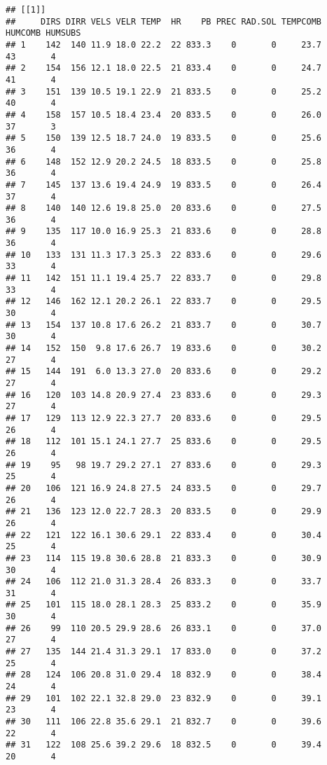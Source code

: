 \documentclass[
]{article}
\begin{document}
\begin{verbatim}
## [[1]]
##     DIRS DIRR VELS VELR TEMP  HR    PB PREC RAD.SOL TEMPCOMB HUMCOMB HUMSUBS
## 1    142  140 11.9 18.0 22.2  22 833.3    0       0     23.7      43       4
## 2    154  156 12.1 18.0 22.5  21 833.4    0       0     24.7      41       4
## 3    151  139 10.5 19.1 22.9  21 833.5    0       0     25.2      40       4
## 4    158  157 10.5 18.4 23.4  20 833.5    0       0     26.0      37       3
## 5    150  139 12.5 18.7 24.0  19 833.5    0       0     25.6      36       4
## 6    148  152 12.9 20.2 24.5  18 833.5    0       0     25.8      36       4
## 7    145  137 13.6 19.4 24.9  19 833.5    0       0     26.4      37       4
## 8    140  140 12.6 19.8 25.0  20 833.6    0       0     27.5      36       4
## 9    135  117 10.0 16.9 25.3  21 833.6    0       0     28.8      36       4
## 10   133  131 11.3 17.3 25.3  22 833.6    0       0     29.6      33       4
## 11   142  151 11.1 19.4 25.7  22 833.7    0       0     29.8      33       4
## 12   146  162 12.1 20.2 26.1  22 833.7    0       0     29.5      30       4
## 13   154  137 10.8 17.6 26.2  21 833.7    0       0     30.7      30       4
## 14   152  150  9.8 17.6 26.7  19 833.6    0       0     30.2      27       4
## 15   144  191  6.0 13.3 27.0  20 833.6    0       0     29.2      27       4
## 16   120  103 14.8 20.9 27.4  23 833.6    0       0     29.3      27       4
## 17   129  113 12.9 22.3 27.7  20 833.6    0       0     29.5      26       4
## 18   112  101 15.1 24.1 27.7  25 833.6    0       0     29.5      26       4
## 19    95   98 19.7 29.2 27.1  27 833.6    0       0     29.3      25       4
## 20   106  121 16.9 24.8 27.5  24 833.5    0       0     29.7      26       4
## 21   136  123 12.0 22.7 28.3  20 833.5    0       0     29.9      26       4
## 22   121  122 16.1 30.6 29.1  22 833.4    0       0     30.4      25       4
## 23   114  115 19.8 30.6 28.8  21 833.3    0       0     30.9      30       4
## 24   106  112 21.0 31.3 28.4  26 833.3    0       0     33.7      31       4
## 25   101  115 18.0 28.1 28.3  25 833.2    0       0     35.9      30       4
## 26    99  110 20.5 29.9 28.6  26 833.1    0       0     37.0      27       4
## 27   135  144 21.4 31.3 29.1  17 833.0    0       0     37.2      25       4
## 28   124  106 20.8 31.0 29.4  18 832.9    0       0     38.4      24       4
## 29   101  102 22.1 32.8 29.0  23 832.9    0       0     39.1      23       4
## 30   111  106 22.8 35.6 29.1  21 832.7    0       0     39.6      22       4
## 31   122  108 25.6 39.2 29.6  18 832.5    0       0     39.4      20       4

\end{verbatim}
\end{document}
